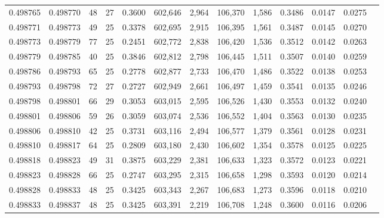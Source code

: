 \begin{tabular}{rrrrrrrrrrrrr}
0.498765 & 0.498770 &  48 &  27 &                                     0.3600 & 602,646 &   2,964 & 106,370 &   1,586 & 0.3486 & 0.0147 & 0.0275 \\
0.498771 & 0.498773 &  49 &  25 &                                     0.3378 & 602,695 &   2,915 & 106,395 &   1,561 & 0.3487 & 0.0145 & 0.0270 \\
0.498773 & 0.498779 &  77 &  25 &                                     0.2451 & 602,772 &   2,838 & 106,420 &   1,536 & 0.3512 & 0.0142 & 0.0263 \\
0.498779 & 0.498785 &  40 &  25 &                                     0.3846 & 602,812 &   2,798 & 106,445 &   1,511 & 0.3507 & 0.0140 & 0.0259 \\
0.498786 & 0.498793 &  65 &  25 &                                     0.2778 & 602,877 &   2,733 & 106,470 &   1,486 & 0.3522 & 0.0138 & 0.0253 \\
0.498793 & 0.498798 &  72 &  27 &                                     0.2727 & 602,949 &   2,661 & 106,497 &   1,459 & 0.3541 & 0.0135 & 0.0246 \\
0.498798 & 0.498801 &  66 &  29 &                                     0.3053 & 603,015 &   2,595 & 106,526 &   1,430 & 0.3553 & 0.0132 & 0.0240 \\
0.498801 & 0.498806 &  59 &  26 &                                     0.3059 & 603,074 &   2,536 & 106,552 &   1,404 & 0.3563 & 0.0130 & 0.0235 \\
0.498806 & 0.498810 &  42 &  25 &                                     0.3731 & 603,116 &   2,494 & 106,577 &   1,379 & 0.3561 & 0.0128 & 0.0231 \\
0.498810 & 0.498817 &  64 &  25 &                                     0.2809 & 603,180 &   2,430 & 106,602 &   1,354 & 0.3578 & 0.0125 & 0.0225 \\
0.498818 & 0.498823 &  49 &  31 &                                     0.3875 & 603,229 &   2,381 & 106,633 &   1,323 & 0.3572 & 0.0123 & 0.0221 \\
0.498823 & 0.498828 &  66 &  25 &                                     0.2747 & 603,295 &   2,315 & 106,658 &   1,298 & 0.3593 & 0.0120 & 0.0214 \\
0.498828 & 0.498833 &  48 &  25 &                                     0.3425 & 603,343 &   2,267 & 106,683 &   1,273 & 0.3596 & 0.0118 & 0.0210 \\
0.498833 & 0.498837 &  48 &  25 &                                     0.3425 & 603,391 &   2,219 & 106,708 &   1,248 & 0.3600 & 0.0116 & 0.0206 \\

\end{tabular}
